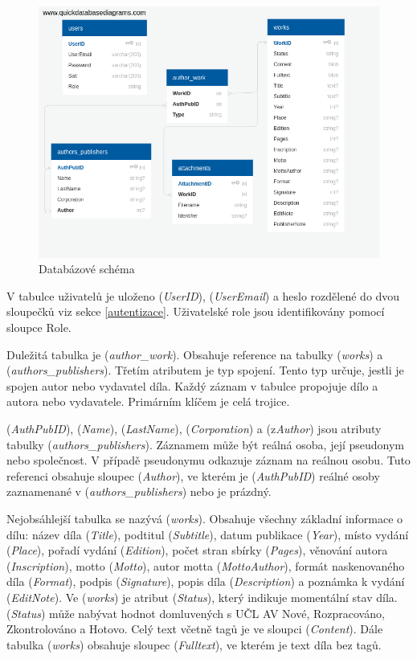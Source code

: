         \begin {figure}[H]\centering
            \includegraphics[width=\textwidth]{images/schema}
            \caption {Databázové schéma}
            \label {fig:schema}
        \end{figure}
        
        V tabulce uživatelů je uloženo (\textit{UserID}), (\textit{UserEmail}) a heslo rozdělené do dvou sloupečků viz sekce \ref{autentizace}. Uživatelské role jsou identifikovány pomocí sloupce Role.
        
        Duležitá tabulka je (\textit{author\_work}). Obsahuje reference na tabulky (\textit{works}) a (\textit{authors\_publishers}). Třetím atributem je typ spojení. Tento typ určuje, jestli je spojen autor nebo vydavatel díla. Každý záznam v tabulce propojuje dílo a autora nebo vydavatele. Primárním klíčem je celá trojice.
        
        (\textit{AuthPubID}), (\textit{Name}), (\textit{LastName}), (\textit{Corporation}) a (z\textit{Author}) jsou atributy tabulky (\textit{authors\_publishers}). Záznamem může být reálná osoba, její pseudonym nebo společnost. V případě pseudonymu odkazuje záznam na reálnou osobu. Tuto referenci obsahuje sloupec (\textit{Author}), ve kterém je (\textit{AuthPubID}) reálné osoby zaznamenané v (\textit{authors\_publishers}) nebo je prázdný.
        
        Nejobsáhlejší tabulka se nazývá (\textit{works}). Obsahuje všechny základní informace o dílu: název díla (\textit{Title}), podtitul (\textit{Subtitle}), datum publikace (\textit{Year}), místo vydání (\textit{Place}), pořadí vydání (\textit{Edition}), počet stran sbírky (\textit{Pages}), věnování autora (\textit{Inscription}), motto (\textit{Motto}), autor motta (\textit{MottoAuthor}), formát naskenovaného díla (\textit{Format}), podpis (\textit{Signature}), popis díla (\textit{Description}) a poznámka k vydání (\textit{EditNote}). Ve (\textit{works}) je atribut (\textit{Status}), který indikuje momentální stav díla. (\textit{Status}) může nabývat hodnot domluvených s UČL AV Nové, Rozpracováno, Zkontrolováno a Hotovo. Celý text včetně tagů je ve sloupci (\textit{Content}). Dále tabulka (\textit{works}) obsahuje sloupec (\textit{Fulltext}), ve kterém je text díla bez tagů.
        
